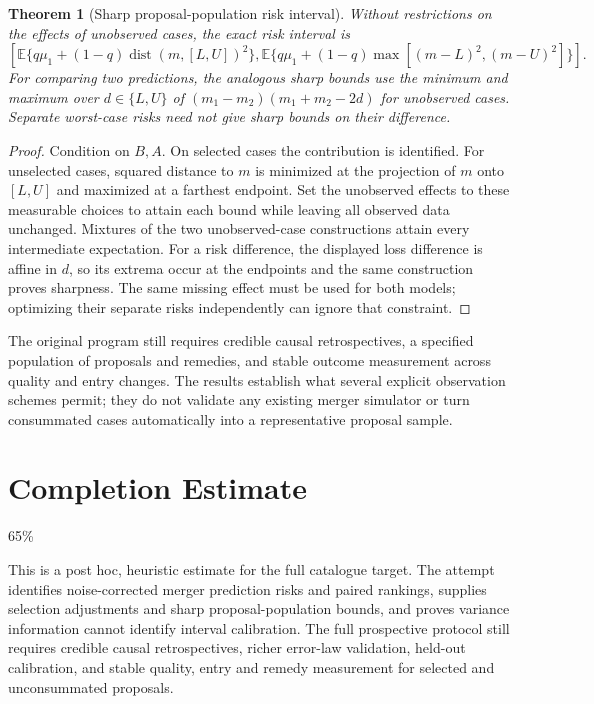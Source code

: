 \documentclass[11pt,a4paper]{article}
\newtheorem{theorem}{Theorem}[section]
\theoremstyle{remark}
\newcommand{\E}{\mathbb E}
\begin{document}
\begin{theorem}[Sharp proposal-population risk interval]
Without restrictions on the effects of unobserved cases, the exact risk interval is
\[
 \left[
 \E\{q\mu_1+(1-q)\operatorname{dist}(m,[L,U])^2\},
 \E\{q\mu_1+(1-q)\max[(m-L)^2,(m-U)^2]\}
 \right]. \tag{8}
\]
For comparing two predictions, the analogous sharp bounds use the minimum and maximum over $d\in\{L,U\}$ of
$(m_1-m_2)(m_1+m_2-2d)$ for unobserved cases. Separate worst-case risks need not give sharp bounds on their difference.
\end{theorem}
\begin{proof}
Condition on $B,A$. On selected cases the contribution is identified. For unselected cases, squared distance to $m$ is minimized at the projection of $m$ onto $[L,U]$ and maximized at a farthest endpoint. Set the unobserved effects to these measurable choices to attain each bound while leaving all observed data unchanged. Mixtures of the two unobserved-case constructions attain every intermediate expectation. For a risk difference, the displayed loss difference is affine in $d$, so its extrema occur at the endpoints and the same construction proves sharpness. The same missing effect must be used for both models; optimizing their separate risks independently can ignore that constraint.
\end{proof}

The original program still requires credible causal retrospectives, a specified population of proposals and remedies, and stable outcome measurement across quality and entry changes. The results establish what several explicit observation schemes permit; they do not validate any existing merger simulator or turn consummated cases automatically into a representative proposal sample.

\section{Completion Estimate}
65\%

This is a post hoc, heuristic estimate for the full catalogue target.
The attempt identifies noise-corrected merger prediction risks and paired rankings, supplies selection adjustments and sharp proposal-population bounds, and proves variance information cannot identify interval calibration. The full prospective protocol still requires credible causal retrospectives, richer error-law validation, held-out calibration, and stable quality, entry and remedy measurement for selected and unconsummated proposals.
\end{document}
